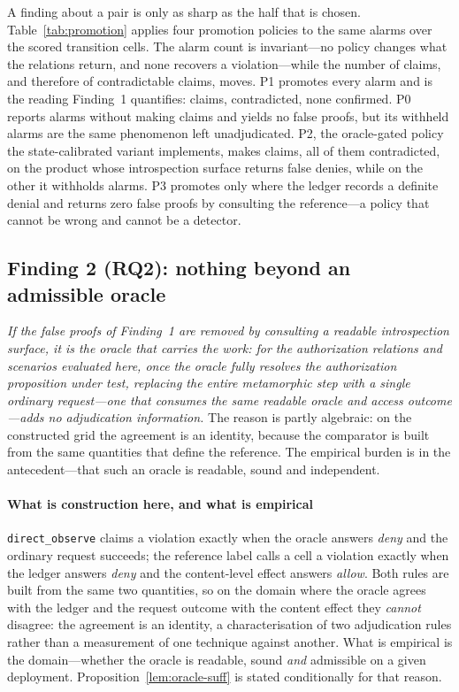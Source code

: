 A finding about a pair is only as sharp as the half that is chosen.
\label{sec:policy}
Table~\ref{tab:promotion}
applies four promotion policies to the same \PolAlarms{} alarms over the \PolCells{} scored
transition cells. The alarm count is invariant---no policy changes what the relations
return, and none recovers a violation---while the number of claims, and therefore of
contradictable claims, moves. P1 promotes every alarm and is the reading Finding~1
quantifies: \PolPallClaims{} claims, \PolPallFalse{} contradicted, none confirmed. P0
reports alarms without making claims and yields no false proofs, but its
\PolPnoneWithheld{} withheld alarms are the same phenomenon left unadjudicated. P2, the
oracle-gated policy the state-calibrated variant implements, makes \PolPoracleClaims{}
claims, all \PolPoracleFalse{} of them contradicted, on the product whose introspection
surface returns false denies, while on the other it withholds \PolGtPoracleWithheld{}
alarms. P3 promotes only where the ledger records a definite denial and returns zero
false proofs by consulting the reference---a policy that cannot be wrong and cannot be a
detector.



\subsection{Finding 2 (RQ2): nothing beyond an admissible oracle}
\label{sec:boundary2}

\emph{If the false proofs of Finding~1 are removed by consulting a readable
introspection surface, it is the oracle that carries the work: for the authorization
relations and scenarios evaluated here, once the oracle fully resolves the authorization
proposition under test, replacing the entire metamorphic step with a single ordinary
request---one that consumes the same readable oracle and access outcome---adds no
adjudication information.} The reason is partly algebraic: on the constructed grid the
agreement is an identity, because the comparator is built from the same quantities that
define the reference. The empirical burden is in the antecedent---that such an oracle is
readable, sound and independent.

\paragraph{What is construction here, and what is empirical}
\texttt{direct\_observe} claims a violation exactly when the oracle answers \emph{deny} and
the ordinary request succeeds; the reference label calls a cell a violation exactly when
the ledger answers \emph{deny} and the content-level effect answers \emph{allow}. Both
rules are built from the same two quantities, so on the domain where the oracle agrees
with the ledger and the request outcome with the content effect they \emph{cannot}
disagree: the agreement is an identity, a characterisation of two adjudication rules
rather than a measurement of one technique against another. What is empirical is the
domain---whether the oracle is readable, sound \emph{and} admissible on a given
deployment. Proposition~\ref{lem:oracle-suff} is stated conditionally for that reason.

